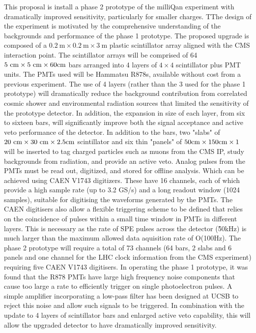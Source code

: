 \documentclass[11pt]{article}
\theoremstyle{plain} \numberwithin{equation}{section}
\theoremstyle{definition}
\begin{document}
This proposal is install a phase 2 prototype of the milliQan experiment with dramatically improved sensitivity, 
particularly for smaller charges. TThe design of the experiment is motivated by 
the comprehensive understanding of the backgrounds and performance of the phase 1 prototype. 
The proposed upgrade is composed of a $0.2~\mathrm{m}\times0.2~\mathrm{m}\times3~\mathrm{m}$ plastic scintillator array aligned with 
the CMS interaction point. The scintillator arrays will be comprised of 64 $5~\rm{cm}\times5~\rm{cm}\times60cm$ 
bars arranged into 4 layers of $4\times4$ scintillator plus PMT units. The PMTs used will be Hammatsu R878s, 
available without cost from a previous experiment. 
The use of 4 layers (rather than the 3 used for the phase 1 prototype)
will dramatically reduce the background contribution from correlated cosmic shower and environmental radiation sources 
that limited the sensitivity of the prototype detector. In addition, the expansion in size of each layer,
from six to sixteen bars, will significantly improve both the signal acceptance and active veto performance of the detector. 
In addition to the bars, two "slabs" of $20~\rm{cm}\times30~\rm{cm}\times2.5cm$ scintillator and 
six thin "panels" of $50\rm{cm}\times150\rm{cm}\times{1}$ 
will be inserted to tag charged particles such as muons from the CMS IP, study backgrounds from radiation, 
and provide an active veto. Analog pulses from the PMTs must be read out,
digitized, and stored for offline analysis. Which can be achieved using CAEN V1743 digitizers. 
These have 16 channels, each of which provide a high sample rate (up to 3.2 GS/s) and a long readout window (1024 samples), 
suitable for digitising the waveforms generated by the PMTs. The CAEN digitisers also allow a flexible triggering
scheme to be defined that relies on the coincidence of pulses within a small time window in PMTs in different layers. This is necessary
as the rate of SPE pulses across the detector (\~50kHz) is much larger than the maximum allowed data aquisition rate of O(100Hz). 
The phase 2 prototype will require a total of 73 channels (64 bars, 2 slabs and 6 panels and one channel
for the LHC clock information from the CMS experiment) requiring five CAEN V1743 digitisers. 
In operating the phase 1 prototype, it was found that the R878 PMTs have large high frequency noise components
that cause too large a rate to efficiently trigger on single photoelectron pulses. A
simple amplifier incorporating a low-pass filter has been designed at UCSB to reject this noise and
allow such signals to be triggered. In combination with the update to 4 layers of scintillator bars
and enlarged active veto capability, this will allow the upgraded detector to have dramatically improved sensitivity.
\end{document}
